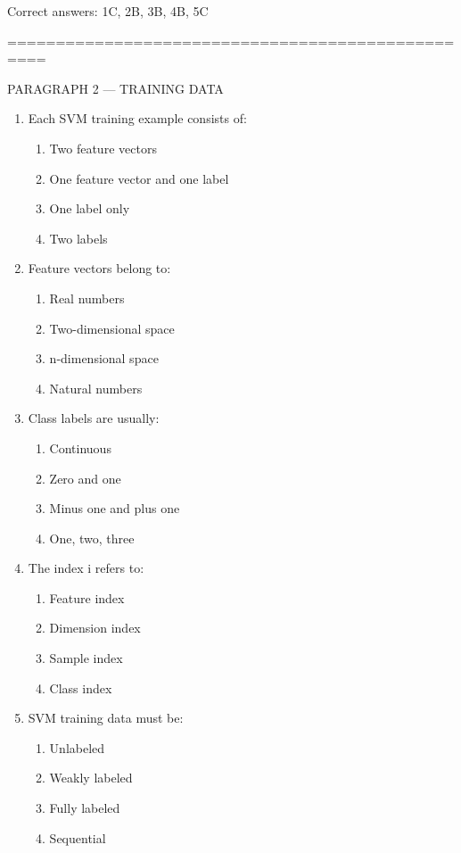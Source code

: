 \documentclass{article}
\begin{document}
	Correct answers: 1C, 2B, 3B, 4B, 5C
	
	\bigskip
	==================================================
	
	PARAGRAPH 2 — TRAINING DATA
	
	\begin{enumerate}
		\item Each SVM training example consists of:
		\begin{enumerate}
			\item Two feature vectors
			\item One feature vector and one label
			\item One label only
			\item Two labels
		\end{enumerate}
		
		\item Feature vectors belong to:
		\begin{enumerate}
			\item Real numbers
			\item Two-dimensional space
			\item n-dimensional space
			\item Natural numbers
		\end{enumerate}
		
		\item Class labels are usually:
		\begin{enumerate}
			\item Continuous
			\item Zero and one
			\item Minus one and plus one
			\item One, two, three
		\end{enumerate}
		
		\item The index i refers to:
		\begin{enumerate}
			\item Feature index
			\item Dimension index
			\item Sample index
			\item Class index
		\end{enumerate}
		
		\item SVM training data must be:
		\begin{enumerate}
			\item Unlabeled
			\item Weakly labeled
			\item Fully labeled
			\item Sequential
		\end{enumerate}
	\end{enumerate}
	
\end{document}
